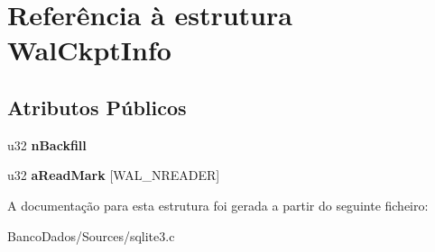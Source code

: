 \hypertarget{struct_wal_ckpt_info}{\section{Referência à estrutura Wal\-Ckpt\-Info}
\label{struct_wal_ckpt_info}
}
\subsection*{Atributos Públicos}
\begin{DoxyCompactItemize}
\item 
\hypertarget{struct_wal_ckpt_info_a5185e508f7da44c391b692e957a84ff6}{u32 {\bfseries n\-Backfill}}\label{struct_wal_ckpt_info_a5185e508f7da44c391b692e957a84ff6}

\item 
\hypertarget{struct_wal_ckpt_info_a3bc01a8244045941d5f59f01123a7735}{u32 {\bfseries a\-Read\-Mark} \mbox{[}W\-A\-L\-\_\-\-N\-R\-E\-A\-D\-E\-R\mbox{]}}\label{struct_wal_ckpt_info_a3bc01a8244045941d5f59f01123a7735}

\end{DoxyCompactItemize}


A documentação para esta estrutura foi gerada a partir do seguinte ficheiro\-:\begin{DoxyCompactItemize}
\item 
Banco\-Dados/\-Sources/sqlite3.\-c\end{DoxyCompactItemize}
